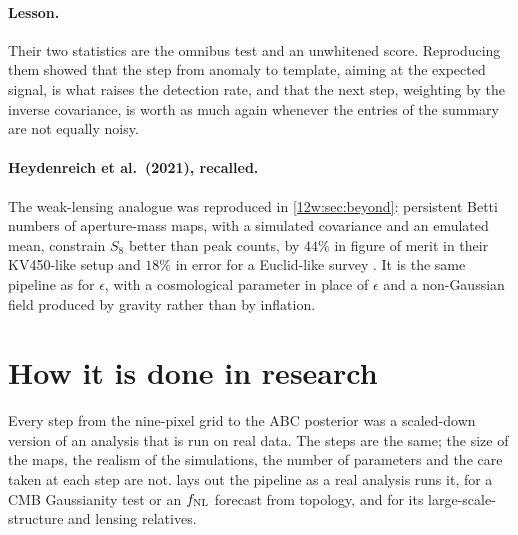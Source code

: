 \paragraph{Lesson.} Their two statistics are the omnibus test and an unwhitened score. Reproducing them showed that the step from anomaly to
template, aiming at the expected signal, is what raises the detection rate, and that the next step, weighting by the inverse covariance, is worth
as much again whenever the entries of the summary are not equally noisy.

\paragraph{Heydenreich et al.\ (2021), recalled.} The weak-lensing analogue was reproduced in \cref{12w:sec:beyond}: persistent Betti numbers of
aperture-mass maps, with a simulated covariance and an emulated mean, constrain $S_8$ better than peak counts, by $44\%$ in figure of merit in their
KV450-like setup and $18\%$ in error for a Euclid-like survey \cite{Heydenreich2021}. It is the same pipeline as for $\epsilon$, with a cosmological
parameter in place of $\epsilon$ and a non-Gaussian field produced by gravity rather than by inflation.
\section{How it is done in research}
\label{12c:sec:research}

Every step from the nine-pixel grid to the ABC posterior was a scaled-down version of an analysis that is run on real data. The steps are the same; the size of the
maps, the realism of the simulations, the number of parameters and the care taken at each step are not. 
lays out the pipeline as a real analysis runs it, for a CMB Gaussianity test or an $f_{\rm NL}$ forecast from topology, and for its
large-scale-structure and lensing relatives.

